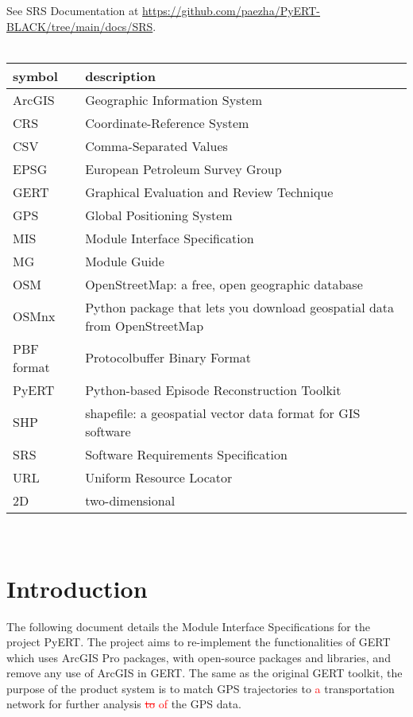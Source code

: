 \documentclass[12pt, titlepage]{article}
\begin{document}
See SRS Documentation at \url{https://github.com/paezha/PyERT-BLACK/tree/main/docs/SRS}.\\\\
\begin{tabular}{l l} 
  \toprule		
  \textbf{symbol} & \textbf{description}\\
  \midrule
    ArcGIS & Geographic Information System \\
    CRS & Coordinate-Reference System \\
      CSV & Comma-Separated Values\\
  EPSG & European Petroleum Survey Group\\
  GERT &  Graphical Evaluation and Review Technique \\
  GPS & Global Positioning System \\
  MIS & Module Interface Specification \\
  MG & Module Guide \\
    OSM & OpenStreetMap: a free, open geographic database \\
    OSMnx & Python package that lets you download geospatial data from OpenStreetMap \\
   PBF format & Protocolbuffer Binary Format\\
  PyERT & Python-based Episode Reconstruction Toolkit\\
  SHP & shapefile: a geospatial vector data format for GIS software\\
    SRS & Software Requirements Specification\\
  URL & Uniform Resource Locator \\
  2D & two-dimensional\\
  \bottomrule
\end{tabular}\\

\newpage

\newpage

\tableofcontents

\newpage


\section{Introduction}

The following document details the Module Interface Specifications for the project PyERT. The project aims to re-implement the functionalities of GERT~\citep{DALUMPINES2018121} which uses ArcGIS Pro packages, with
open-source packages and libraries, and remove any use of ArcGIS in GERT. The same as the original GERT toolkit, the purpose of the product system is to match GPS trajectories to \textcolor{red}{a} transportation network for further analysis \textcolor{red}{\sout{to} of} the GPS data. 
\end{document}
